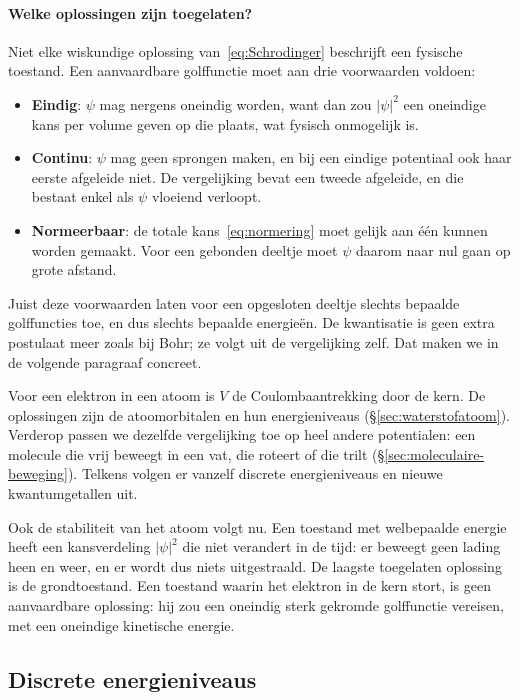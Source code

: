\paragraph{Welke oplossingen zijn toegelaten?}
Niet elke wiskundige oplossing van~\eqref{eq:Schrodinger} beschrijft een fysische toestand. Een aanvaardbare golffunctie moet aan drie voorwaarden voldoen:
\begin{itemize}
\item \textbf{Eindig}: $\psi$ mag nergens oneindig worden, want dan zou $|\psi|^2$ een oneindige kans per volume geven op die plaats, wat fysisch onmogelijk is.
\item \textbf{Continu}: $\psi$ mag geen sprongen maken, en bij een eindige potentiaal ook haar eerste afgeleide niet. De vergelijking bevat een tweede afgeleide, en die bestaat enkel als $\psi$ vloeiend verloopt.
\item \textbf{Normeerbaar}: de totale kans~\eqref{eq:normering} moet gelijk aan één kunnen worden gemaakt. Voor een gebonden deeltje moet $\psi$ daarom naar nul gaan op grote afstand.
\end{itemize}
Juist deze voorwaarden laten voor een opgesloten deeltje slechts bepaalde golffuncties toe, en dus slechts bepaalde energieën. De kwantisatie is geen extra postulaat meer zoals bij Bohr; ze volgt uit de vergelijking zelf. Dat maken we in de volgende paragraaf concreet.

Voor een elektron in een atoom is $V$ de Coulombaantrekking door de kern. De oplossingen zijn de atoomorbitalen en hun energieniveaus (\S\ref{sec:waterstofatoom}). Verderop passen we dezelfde vergelijking toe op heel andere potentialen: een molecule die vrij beweegt in een vat, die roteert of die trilt (\S\ref{sec:moleculaire-beweging}). Telkens volgen er vanzelf discrete energieniveaus en nieuwe kwantumgetallen uit.

Ook de stabiliteit van het atoom volgt nu. Een toestand met welbepaalde energie heeft een kansverdeling $|\psi|^2$ die niet verandert in de tijd: er beweegt geen lading heen en weer, en er wordt dus niets uitgestraald. De laagste toegelaten oplossing is de grondtoestand. Een toestand waarin het elektron in de kern stort, is geen aanvaardbare oplossing: hij zou een oneindig sterk gekromde golffunctie vereisen, met een oneindige kinetische energie.

\subsection{Discrete energieniveaus}
\label{sec:discrete-energieniveaus}


